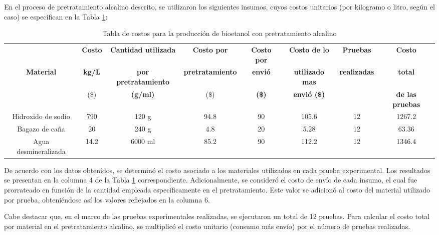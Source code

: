 \documentclass[12pt]{article}
\begin{document}
En el proceso de pretratamiento alcalino descrito, se utilizaron los siguientes insumos, cuyos costos unitarios (por kilogramo o litro, según el caso) se especifican en la Tabla \ref{Costo para pretratamiento alcalino}:


			
				\begin{table}[H]
				\centering
				\caption{Tabla de costos para la producción de bioetanol con pretratamiento alcalino}
				\label{Costo para pretratamiento alcalino}
				\resizebox{16cm}{!} {
					\begin{tabular}{|c|c|c|c|c|c|c|c|}
						\hline
									& \textbf{Costo}& \textbf{Cantidad utilizada } &\textbf{Costo por }  &\textbf{Costo por }  & \textbf{Costo de lo }  &\textbf{Pruebas} & \textbf{Costo } \\
					\textbf{Material}&	\textbf{kg/L} & 	\textbf{por pretratamiento} & \textbf{pretratamiento} & \textbf{envió} & \textbf{utilizado mas }  & \textbf{realizadas } & \textbf{total }  \\
								 	& 			(\$)		& \textbf{(g/ml)} &	(\$)  &\textbf{(\$)}  & \textbf{envió (\$)} & & \textbf{de las pruebas}\\ \hline		
						Hidroxido de sodio&790& 120 g & 94.8& 90 & 105.6& 12 &1267.2\\ \hline
						Bagazo de caña 	  &20& 240 g  &4.8  & 20 & 5.28 & 12  &63.36 \\ \hline
						Agua desmineralizada&14.2& 6000 ml& 85.2 & 90 & 112.2 & 12 & 1346.4 \\ \hline
				\end{tabular} }
				
			\end{table}
     De acuerdo con los datos obtenidos, se determinó el costo asociado a los materiales utilizados en cada prueba experimental. Los resultados se presentan en la columna 4 de la Tabla \ref{Costo para pretratamiento alcalino} correspondiente. Adicionalmente, se consideró el costo de envío de cada insumo, el cual fue prorrateado en función de la cantidad empleada específicamente en el pretratamiento. Este valor se adicionó al costo del material utilizado por prueba, obteniéndose así los valores reflejados en la columna 6.

     Cabe destacar que, en el marco de las pruebas experimentales realizadas, se ejecutaron un total de 12 pruebas. Para calcular el costo total por material en el pretratamiento alcalino, se multiplicó el costo unitario (consumo más envío) por el número de pruebas realizadas.
\end{document}
